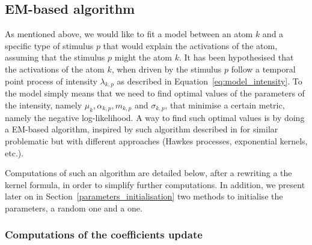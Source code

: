 \subsection{EM-based algorithm}

As mentioned above, we would like to fit a model between an atom $k$ and a specific type of stimulus $p$ that would explain the activations of the atom, assuming that the stimulus $p$ might  the atom $k$.
It has been hypothesised that the activations of the atom $k$, when driven by the stimulus $p$ follow a temporal point process of intensity $\lambda_{k,p}$ as described in Equation~\eqref{eq:model_intensity}.
To  the model simply means that we need to find optimal values of the parameters of the intensity, namely $\mu_k, \alpha_{k,p}, m_{k,p}$ and $\sigma_{k,p}$, that minimise a certain metric, namely the negative log-likelihood.
A way to find such optimal values is by doing a EM-based algorithm, inspired by such algorithm described in \citep{lewis2011nonparametric, xu2016learning} for similar problematic but with different approaches (Hawkes processes, exponential kernels, etc.).

Computations of such an algorithm are detailed below, after a rewriting a the kernel formula, in order to simplify further computations.
In addition, we present later on in Section~\ref{parameters_initialisation} two methods to initialise the parameters, a random one and a  one.

\subsubsection{Computations of the coefficients update}

